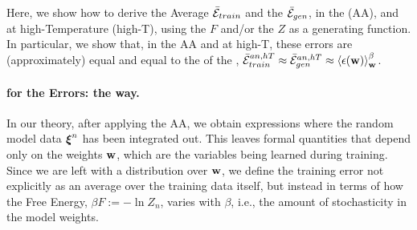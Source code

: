 {

Here, we show how to derive the Average \TrainingError $\bar{\mathcal{E}}_{train}$ and  the \AverageGeneralizationError $\bar{\mathcal{E}}_{gen}$,
in the \AnnealedApproximation (AA), and at high-Temperature (high-T), using the \FreeEnergy $F$ and/or the \PartitionFunction $Z$ as
a generating function.  
In particular, we show that, in the AA and at high-T, these errors are (approximately) equal
and equal to the \ThermalAverage of the \EffectivePotential,
$\bar{\mathcal{E}}_{train}^{an, hT} \approx \bar{\mathcal{E}}_{gen}^{an, hT} \approx \left\langle \epsilon({\mathbf{w}}) \right\rangle_{\mathbf w}^{\beta}$.


\paragraph{\GeneratingFunctions for the Errors: the \STATMECH way.}
In our theory, after applying the AA, we obtain expressions where the random model data $\boldsymbol{\xi}^{n}$ has been integrated out. This leaves formal quantities that depend only on the weights ${\mathbf{w}}$, which are the variables being learned during training.
Since we are left with a distribution over ${\mathbf{w}}$, we define the training error not explicitly as an average over the training data itself, but instead in terms of how the Free Energy, $\beta F :=-\ln Z_{n}$, varies with $\beta$, i.e., the amount of stochasticity in the model weights.

}
